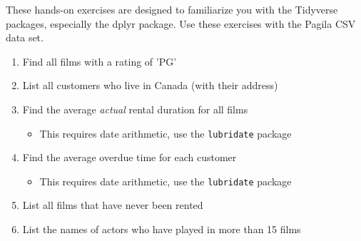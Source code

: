 \begin{exercisebox}

These hands-on exercises are designed to familiarize you with the Tidyverse packages, especially the dplyr package. Use these exercises with the Pagila CSV data set.

\begin{enumerate}[nosep]
  \item Find all films with a rating of 'PG'
  \item List all customers who live in Canada (with their address)
  \item Find the average \emph{actual} rental duration for all films
  \begin{itemize}
     \item This requires date arithmetic, use the \texttt{lubridate} package
  \end{itemize}
  \item Find the average overdue time for each customer
  \begin{itemize}
     \item This requires date arithmetic, use the \texttt{lubridate} package
  \end{itemize}
  \item List all films that have never been rented
  \item List the names of actors who have played in more than 15 films
\end{enumerate}
\end{exercisebox}
